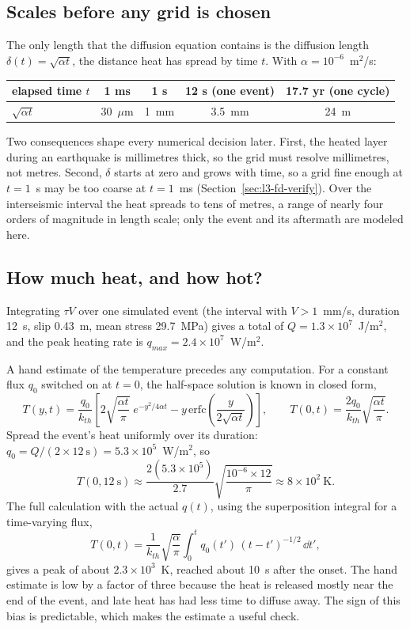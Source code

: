 \subsection{Scales before any grid is chosen}

The only length that the diffusion equation contains is the diffusion length $\delta(t)=\sqrt{\alpha t}$, the distance heat has spread by time $t$. With $\alpha=10^{-6}$~m$^2$/s:
\begin{center}
\small
\begin{tabular}{lcccc}
\toprule
elapsed time $t$ & 1 ms & 1 s & 12 s (one event) & 17.7 yr (one cycle) \\
\midrule
$\sqrt{\alpha t}$ & 30~$\mu$m & 1~mm & 3.5~mm & 24~m \\
\bottomrule
\end{tabular}
\end{center}
Two consequences shape every numerical decision later. First, the heated layer during an earthquake is millimetres thick, so the grid must resolve millimetres, not metres. Second, $\delta$ starts at zero and grows with time, so a grid fine enough at $t=1$~s may be too coarse at $t=1$~ms (Section~\ref{sec:l3-fd-verify}). Over the interseismic interval the heat spreads to tens of metres, a range of nearly four orders of magnitude in length scale; only the event and its aftermath are modeled here.

\subsection{How much heat, and how hot?}

Integrating $\tau V$ over one simulated event (the interval with $V>1$~mm/s, duration 12~s, slip 0.43~m, mean stress 29.7~MPa) gives a total of $Q=1.3\times10^{7}$~J/m$^2$, and the peak heating rate is $q_{max}=2.4\times10^{7}$~W/m$^2$.

A hand estimate of the temperature precedes any computation. For a constant flux $q_0$ switched on at $t=0$, the half-space solution is known in closed form,
\begin{equation}
T(y,t)=\frac{q_0}{k_{th}}\left[2\sqrt{\frac{\alpha t}{\pi}}\;e^{-y^2/4\alpha t}-y\,\mathrm{erfc}\!\left(\frac{y}{2\sqrt{\alpha t}}\right)\right],\qquad T(0,t)=\frac{2q_0}{k_{th}}\sqrt{\frac{\alpha t}{\pi}}.
\label{eq:l3-exact}
\end{equation}
Spread the event's heat uniformly over its duration: $q_0=Q/(2\times12\ \text{s})=5.3\times10^5$~W/m$^2$, so
\[
T(0,12\ \text{s})\approx\frac{2(5.3\times10^5)}{2.7}\sqrt{\frac{10^{-6}\times12}{\pi}}\approx 8\times10^{2}\ \text{K}.
\]
The full calculation with the actual $q(t)$, using the superposition integral for a time-varying flux,
\begin{equation}
T(0,t)=\frac{1}{k_{th}}\sqrt{\frac{\alpha}{\pi}}\int_0^t q_0(t')\,(t-t')^{-1/2}\,\dd t',
\end{equation}
gives a peak of about $2.3\times10^3$~K, reached about 10~s after the onset. The hand estimate is low by a factor of three because the heat is released mostly near the end of the event, and late heat has had less time to diffuse away. The sign of this bias is predictable, which makes the estimate a useful check.

